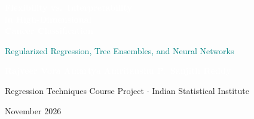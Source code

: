 \documentclass[aspectratio=169,11pt]{beamer}
\begin{document}
{
\begin{frame}[plain,c]
  \centering
  \vspace*{0.25cm}

  {\fontsize{24}{30}\selectfont\bfseries\textcolor{white}{Flexibility vs.\ Interpretability\\[4pt]in High-Dimensional\\[4pt]Cancer Classification}}\par
  \vspace{0.45cm}

  {\fontsize{13}{16}\selectfont\textcolor{teal}{Regularized Regression, Tree Ensembles, and Neural Networks}}\par
  \vspace{1.05cm}

  {\fontsize{11.5}{15}\selectfont\bfseries\textcolor{white}{Rajveer Vora \qquad Amartya Amritanshu \qquad P.\ Sanjith Reddy}}\par
  \vspace{0.45cm}

  {\footnotesize\textcolor{white!65!covernavy}{Regression Techniques Course Project $\cdot$ Indian Statistical Institute}}\par
  \vspace{0.14cm}
  {\footnotesize\textcolor{white!65!covernavy}{November 2026}}
\end{frame}
}
\end{document}
